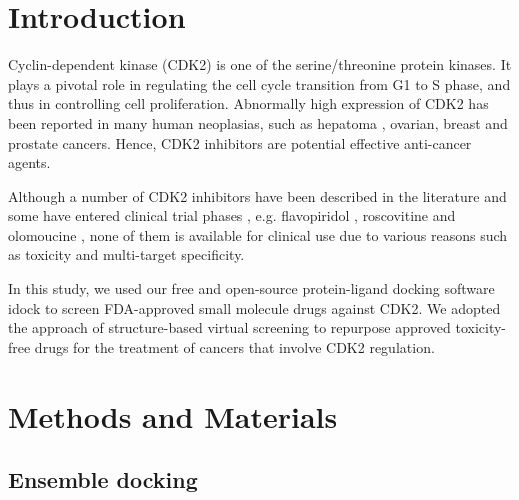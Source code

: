 \documentclass[10pt]{article}
\begin{document}

\section*{Introduction}
Cyclin-dependent kinase (CDK2) is one of the serine/threonine protein kinases. It plays a pivotal role in regulating the cell cycle transition from G1 to S phase, and thus in controlling cell proliferation. Abnormally high expression of CDK2 has been reported in many human neoplasias, such as hepatoma , ovarian, breast and prostate cancers. Hence, CDK2 inhibitors are potential effective anti-cancer agents.

Although a number of CDK2 inhibitors have been described in the literature and some have entered clinical trial phases \cite{1603}, e.g. flavopiridol \cite{1596}, roscovitine \cite{1597} and olomoucine \cite{1598}, none of them is available for clinical use due to various reasons such as toxicity and multi-target specificity.

In this study, we used our free and open-source protein-ligand docking software idock \cite{1153,1362} to screen FDA-approved small molecule drugs against CDK2. We adopted the approach of structure-based virtual screening to repurpose approved toxicity-free drugs for the treatment of cancers that involve CDK2 regulation.

\section*{Methods and Materials}

\subsection*{Ensemble docking}
\end{document}
